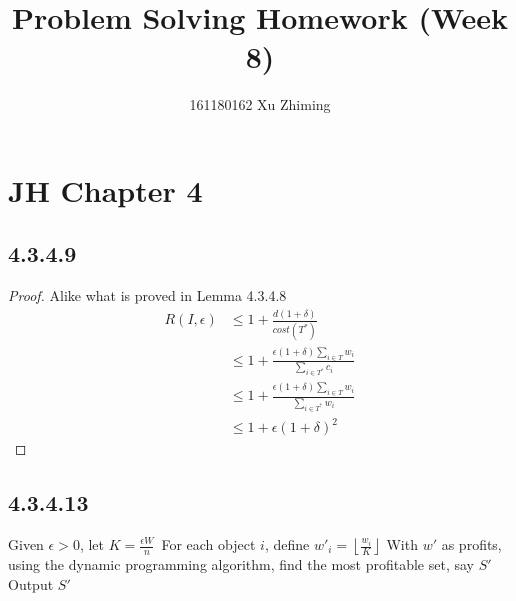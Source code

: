 \documentclass[twocolumn, 10.5pt]{article}
\begin{document}
	\title{Problem Solving Homework (Week 8)}\author{161180162 Xu Zhiming}\maketitle
	\section*{JH Chapter 4}
	\subsection*{4.3.4.9}
	\begin{proof}
		Alike what is proved in Lemma 4.3.4.8
		\[
		\begin{aligned}
			R(I,\epsilon)&\le 1+\frac{d(1+\delta)}{cost(T^*)}\\
			&\le 1+\frac{\epsilon(1+\delta)\sum_{i\in T}w_i}{\sum_{i\in T^*}c_i}\\
			&\le 1+\frac{\epsilon(1+\delta)\sum_{i\in T}w_i}{\sum_{i\in T^*}w_i}\\
			&\le 1+\epsilon(1+\delta)^2
		\end{aligned}
		\]
	\end{proof}
	\subsection*{4.3.4.13}
	\begin{codebox}
		\li Given $\epsilon>0$, let $K=\frac{\epsilon W}{n}$\li \
		For each object $i$, define $w'_i=\left\lfloor  \frac{w_i}{K}\right\rfloor$\li 
		With $w'$ as profits, using the dynamic programming algorithm, \zi 
		find the most profitable set, say $S'$\li 
		Output $S'$
	\end{codebox}
\end{document}
